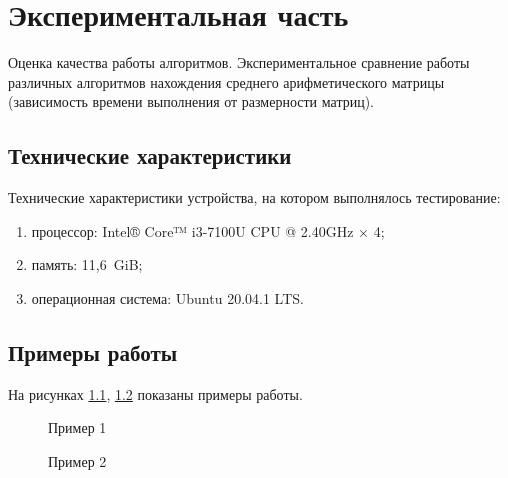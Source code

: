 
\chapter{Экспериментальная часть}\label{exp}

Оценка качества работы алгоритмов. Экспериментальное сравнение работы различных алгоритмов нахождения среднего арифметического матрицы
(зависимость времени выполнения от размерности матриц).

\section{Технические характеристики}\label{texcharacters}

Технические характеристики устройства, на котором выполнялось тестирование:

\begin{enumerate}
    \item процессор: Intel® Core™ i3-7100U CPU @ 2.40GHz × 4; 
    \item память: 11,6 GiB;
    \item операционная система: Ubuntu 20.04.1 LTS.
\end{enumerate}

\section{Примеры работы}\label{examples}

На рисунках \ref{ris:w1}, \ref{ris:w2} показаны примеры работы.

\begin{figure}[H]
    \center{\texttt{[image: w1]}}
    \caption{Пример 1}
    \label{ris:w1}
\end{figure}
  
\begin{figure}[H]
    \center{\texttt{[image: w2]}}
    \caption{Пример 2}
    \label{ris:w2}
\end{figure}
  
  

